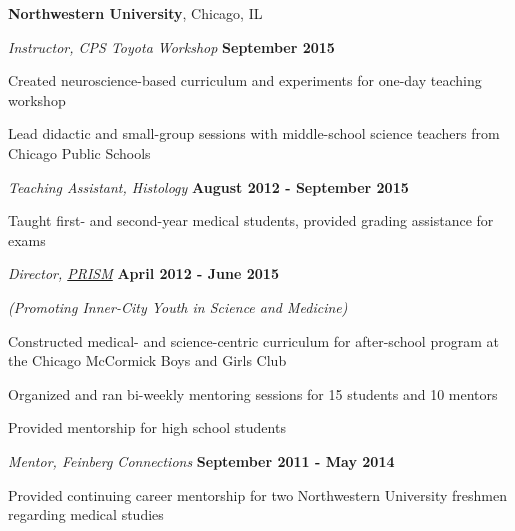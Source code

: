 \documentclass[10pt]{article}
\begin{document}
\textbf{Northwestern University},
Chicago, IL
\begin{outerlist}

\item[] \textit{Instructor, CPS Toyota Workshop}%
	\hfill \textbf{September 2015}
\begin{innerlist}
\item Created neuroscience-based curriculum and experiments for one-day teaching workshop
\item Lead didactic and small-group sessions with middle-school science teachers from Chicago Public Schools
\end{innerlist}
	
\item[] \textit{Teaching Assistant, Histology}%
        \hfill \textbf{August 2012 - September 2015}
\begin{innerlist}
\item Taught first- and second-year medical students, provided grading assistance for exams
\end{innerlist}

\item[] \textit{Director, \href{http://www.feinberg.northwestern.edu/sites/mstp/about-us/prism/index.html}{PRISM}}
	\hfill \textbf{April 2012 - June 2015}
	
	\textit{(Promoting Inner-City Youth in Science and Medicine)}
	\begin{innerlist}
	\item Constructed medical- and science-centric curriculum for after-school program at the Chicago McCormick Boys and Girls Club
	\item Organized and ran bi-weekly mentoring sessions for 15 students and 10 mentors
	\item Provided mentorship for high school students
	\end{innerlist}
	
\item[] \textit{Mentor, Feinberg Connections}
	\hfill \textbf{September 2011 - May 2014}
	\begin{innerlist}
	\item Provided continuing career mentorship for two Northwestern University freshmen regarding medical studies
	\end{innerlist}

\end{outerlist}
\end{document}
